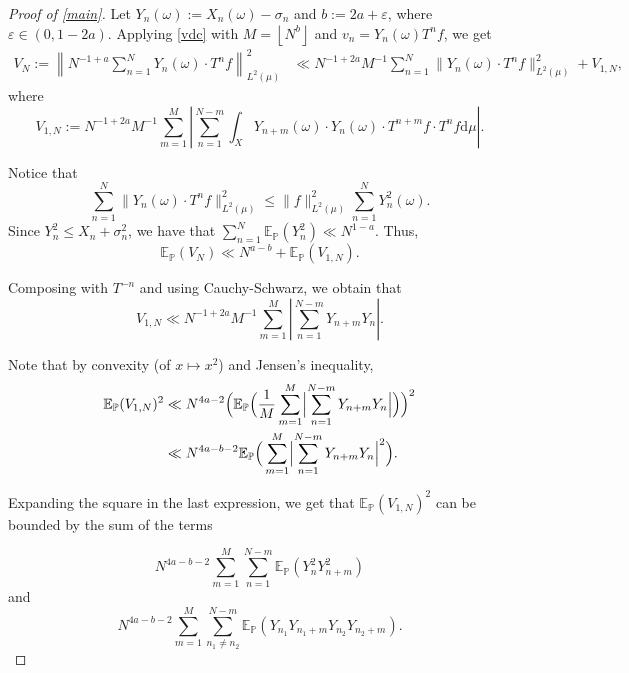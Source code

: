 \documentclass[11pt]{amsart}
\numberwithin{equation}{section}
\theoremstyle{definition}
\theoremstyle{plain}
\newcommand{\E}{{\mathbb E}}
\renewcommand{\P}{{\mathbb P}}
\begin{document}
\begin{proof}[Proof of \cref{main}]
  Let $Y_n(\omega):=X_n(\omega)-\sigma_n
   $ and $b:=2a+\varepsilon$, where $\varepsilon\in (0,1-2a)$. Applying \cref{vdc} with $M=\left \lfloor N^b \right\rfloor $ and $v_n=Y_n(\omega)T^nf$, we get 
    \begin{equation*}
          \begin{split}
          V_N:=\left\|N^{-1+a}\sum_{n=1}^N Y_n(\omega)\cdot T^{n}f \right\|^2_{L^2(\mu)}&\ll N^{-1+2a} M^{-1}\sum_{n=1}^{N}\| Y_n(\omega)\cdot T^{n}f\|_{L^2(\mu)}^2+V_{1,N},
    \end{split}
    \end{equation*}
where \[V_{1,N}:=N^{-1+2a}M^{-1}\sum_{m=1}^{M}\left|\sum_{n=1}^{N-m}\int_{X} Y_{n+m}(\omega)\cdot Y_n(\omega)\cdot T^{n+m}f\cdot T^n f\text{d}\mu\right|.\]


Notice that $$\sum_{n=1}^{N}\| Y_n(\omega)\cdot T^{n}f\|_{L^2(\mu)}^2\leq \|f\|^2_{L^2(\mu)}\sum_{n=1}^NY^2_n(\omega).$$ Since $Y_n^2\leq X_n+\sigma_n^2$, we have  that $\sum_{n=1}^N \mathbb{E}_{\mathbb{P}}(Y^2_n)\ll N^{1-a}$. Thus, \begin{equation}
    \mathbb{E}_{\mathbb{P}}(V_N)\ll N^{a-b}+\mathbb{E}_{\mathbb{P}}(V_{1,N}).\label{eqn:main3}
\end{equation}

Composing with $T^{-n}$ and using Cauchy-Schwarz, we obtain that
\begin{equation}
    V_{1,N}\ll N^{-1+2a}M^{-1}\sum_{m=1}^{M}\left|\sum_{n=1}^{N-m}Y_{n+m}Y_n\right|.\label{eqn:main4}
\end{equation}

Note that by convexity (of $x\mapsto x^2$) and Jensen's inequality, \begin{align*}
\E_{\P}(V_{1,N})^2&\ll N^{4a-2}\Big (\E_{\P} \Big(\frac{1}{M}\sum_{m=1}^M \Bigl|\sum_{n=1}^{N-m} Y_{n+m}Y_{n} \Bigr |\Big)\Big)^2\\ 
&\ll N^{4a-b-2} \E_{\P} \Big(\sum_{m=1}^M \Bigl|\sum_{n=1}^{N-m} Y_{n+m}Y_{n} \Bigr |^2 \Big).
\end{align*}

Expanding the square in the last expression, we get that $\E_{\P}(V_{1,N})^2$ can be bounded by the sum of the terms 

\begin{equation}
    N^{4a-b-2}\sum_{m=1}^M \sum_{n=1}^{N-m}  \E_{\P} (Y_n^2Y_{n+m}^2)
\label{eq:term1}\end{equation}
and 
\begin{equation}
N^{4a-b-2}\sum_{m=1}^M \sum_{n_1\neq n_2}^{N-m} \mathbb{E}_{\P}(Y_{n_1}Y_{n_1+m}Y_{n_2}Y_{n_2+m}). \label{eq:term2}
\end{equation}


\end{proof}
\end{document}
